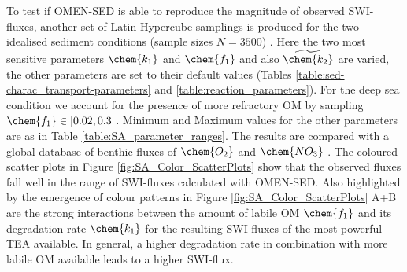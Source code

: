 \documentclass[gmd, manuscript]{copernicus}
\begin{document}
To test if OMEN-SED is able to reproduce the magnitude of observed SWI-fluxes, another set of Latin-Hypercube samplings is produced for the two idealised sediment conditions (sample sizes $N=3500$) . 
Here the two most sensitive parameters $\chem{k_1}$ and $\chem{f_1}$ and also $\widetilde{\chem{k_2}}$ are varied, the other parameters are set to their default values (Tables \ref{table:sed-charac_transport-parameters} and \ref{table:reaction_parameters}). 
For the deep sea condition we account for the presence of more refractory OM by sampling $\chem{f_1} \in [0.02, 0.3]$. Minimum and Maximum values for the other parameters are as in Table \ref{table:SA_parameter_ranges}.
The results are compared with a global database of benthic fluxes of $\chem{O_2}$ and $\chem{NO_3}$ \citep{bohlen_simple_2012}. 
The coloured scatter plots in Figure \ref{fig:SA_Color_ScatterPlots} show that the observed fluxes fall well in the range of SWI-fluxes calculated with OMEN-SED. 
Also highlighted by the emergence of colour patterns in Figure \ref{fig:SA_Color_ScatterPlots} A+B are the strong interactions between the amount of labile OM  $\chem{f_1}$ and 
its degradation rate $\chem{k_1}$ for the resulting SWI-fluxes of the most powerful TEA available. In general, a higher degradation rate in combination with more labile OM available 
leads to a higher SWI-flux. 

\end{document}
